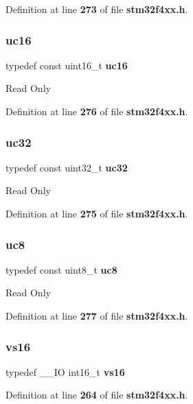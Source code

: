Definition at line \textbf{ 273} of file \textbf{ stm32f4xx.\+h}.

\mbox{\label{group__Exported__types_gabc715ea3779494b5a4f53173a397f7cb}} 
\subsubsection{uc16}
{\footnotesize\ttfamily typedef const uint16\+\_\+t \textbf{ uc16}}

Read Only 

Definition at line \textbf{ 276} of file \textbf{ stm32f4xx.\+h}.

\mbox{\label{group__Exported__types_ga5b628e6a05856ff67e535fa391a57683}} 
\subsubsection{uc32}
{\footnotesize\ttfamily typedef const uint32\+\_\+t \textbf{ uc32}}

Read Only 

Definition at line \textbf{ 275} of file \textbf{ stm32f4xx.\+h}.

\mbox{\label{group__Exported__types_gac74022c74a461f810e0d4fdc9bfea480}} 
\subsubsection{uc8}
{\footnotesize\ttfamily typedef const uint8\+\_\+t \textbf{ uc8}}

Read Only 

Definition at line \textbf{ 277} of file \textbf{ stm32f4xx.\+h}.

\mbox{\label{group__Exported__types_ga19c9450d60abff7c6d3d35f31c10f83e}} 
\subsubsection{vs16}
{\footnotesize\ttfamily typedef \+\_\+\+\_\+\+IO int16\+\_\+t \textbf{ vs16}}



Definition at line \textbf{ 264} of file \textbf{ stm32f4xx.\+h}.

